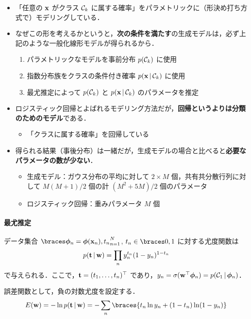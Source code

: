 \begin{itemize}
  \item 「任意の ${\mathbf{x}}$ がクラス ${\mathcal{C}}_k$ に属する確率」をパラメトリックに（形決め打ち方式で）モデリングしている．
  \item なぜこの形を考えるかというと，\textbf{次の条件を満たす}の生成モデルは，必ず上記のような一般化線形モデルが得られるから．
  \begin{enumerate}
    \item パラメトリックなモデルを事前分布 $p({\mathcal{C}}_k)$ に使用
    \item 指数分布族をクラスの条件付き確率 $p({\mathbf{x}} \,|\, {\mathcal{C}}_k)$ に使用
    \item 最尤推定によって $p({\mathcal{C}}_k)$ と $p({\mathbf{x}} \,|\, {\mathcal{C}}_k)$ のパラメータを推定
  \end{enumerate}
  \item ロジスティック回帰とよばれるモデリング方法だが，\textbf{回帰というよりは分類のためのモデル}である．
  \begin{itemize}
    \item 「クラスに属する確率」を回帰している
  \end{itemize}
  \item 得られる結果（事後分布）は一緒だが，生成モデルの場合と比べると\textbf{必要なパラメータの数が少ない}．
  \begin{itemize}
    \item 生成モデル：ガウス分布の平均に対して $2 \times M$ 個，共有共分散行列に対して $M(M+1)/2$ 個の計 $(M^2 + 5M)/2$ 個のパラメータ
    \item ロジスティック回帰：重みパラメータ $M$ 個
  \end{itemize}
\end{itemize}

\newpage
\setcounter{equation}{88}
\paragraph{最尤推定}

データ集合 $\set{\vphi_n = \vphi(\vx_n), t_n}_{n = 1}^N$, $t_n \in \set{0, 1}$ に対する尤度関数は
\begin{equation}
  p({\mathbf{t}} \,|\, {\mathbf{w}}) = \prod_n y_n^{t_n} (1 - y_n)^{1 - t_n}
\end{equation}
で与えられる．ここで，${\mathbf{t}} = (t_1,\dots,t_n)^\top$ であり，$y_n = \sigma({\mathbf{w}}^\top\boldsymbol{\phi}_n) = p({\mathcal{C}}_1 \,|\, \boldsymbol{\phi}_n)$．

誤差関数として，負の対数尤度を設定する．
\begin{equation}
  E(\vw) = - \ln p(\vt \given \vw) = - \sum_n \braces{t_n \ln y_n + (1 - t_n)\ln(1 - y_n)}
\end{equation}

